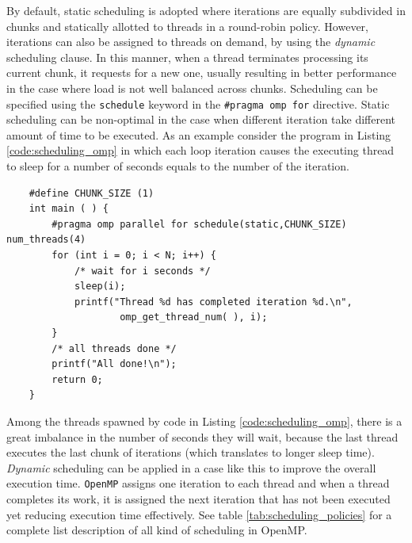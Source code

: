 \begin{description}
    By default, static scheduling is adopted where iterations are equally
    subdivided in chunks and statically allotted to threads in a
    round-robin policy. However, iterations can also be assigned to
    threads on demand, by using the \textit{dynamic} scheduling clause. In this
    manner, when a thread terminates processing its current chunk, it requests for a new one, usually resulting in better performance in the case where load is not well balanced across chunks.
    Scheduling can be specified using the \texttt{schedule} keyword in the \texttt{\#pragma omp for} directive.
    Static scheduling can be non-optimal in the case when different iteration take different amount of time to be executed. As an example consider the program in Listing \ref{code:scheduling_omp} in which each loop iteration causes the executing thread to sleep for a number of seconds equals to the number of the iteration. 
    \begin{lstlisting}
    #define CHUNK_SIZE (1)
    int main ( ) {
    	#pragma omp parallel for schedule(static,CHUNK_SIZE) num_threads(4)
    	for (int i = 0; i < N; i++) {
    		/* wait for i seconds */
    		sleep(i);    		
    		printf("Thread %d has completed iteration %d.\n", 
    				omp_get_thread_num( ), i);
    	}
    	/* all threads done */
    	printf("All done!\n");
    	return 0;
    }
\end{lstlisting}
Among the threads spawned by code in Listing \ref{code:scheduling_omp}, there is a great imbalance  in the number of seconds they will wait,  because the last thread executes the last chunk of iterations (which translates to longer sleep time).
\textit{Dynamic} scheduling can be applied in a case like this to improve the overall execution time. \texttt{OpenMP} assigns one iteration to each thread and when a thread completes its work, it is assigned the next iteration that has not been executed yet reducing execution time effectively. See table \ref{tab:scheduling_policies} for a complete list description of all kind of scheduling in OpenMP.


\end{description}
